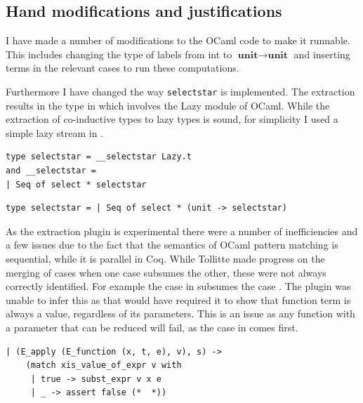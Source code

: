 \documentclass[12pt,twoside,notitlepage]{report}
\begin{document}
\subsection{Hand modifications and justifications}
I have made a number of modifications to the OCaml code to make it runnable. This includes changing the type of labels from int to $ \textbf{unit}\rightarrow\textbf{unit} $ and inserting terms in the relevant cases to run these computations. 

Furthermore I have changed the way \verb|selectstar| is implemented. The extraction results in the type in  which involves the Lazy module of OCaml. While the extraction of co-inductive types to lazy types is sound, for simplicity I used a simple lazy stream in . 

\begin{minipage}{\linewidth}
\begin{lstlisting}[caption={OCaml lazy selectstar}, label={lst:ocamllazystar}]
type selectstar = __selectstar Lazy.t
and __selectstar =
| Seq of select * selectstar
\end{lstlisting}
\end{minipage}

\begin{minipage}{\linewidth}
\begin{lstlisting}[caption={OCaml stream selectstar}, label={lst:ocamlstreamstar}]
type selectstar = | Seq of select * (unit -> selectstar) 
\end{lstlisting}
\end{minipage}

As the extraction plugin is experimental there were a number of inefficiencies and a few issues due to the fact that the semantics of OCaml pattern matching is sequential, while it is parallel in Coq. While Tollitte\cite{tollitte2012producing} made progress on the merging of cases when one case subsumes the other, these were not always correctly identified. For example the case  in  subsumes the case . The plugin was unable to infer this as that would have required it to show that function term is always a value, regardless of its parameters. This is an issue as any function with a parameter that can be reduced will fail, as the case in  comes first.

\begin{minipage}{\linewidth}
\begin{lstlisting}[caption={OCaml original substitution case}, label={lst:ocamlorigsub}]
  | (E_apply (E_function (x, t, e), v), s) ->
    (match xis_value_of_expr v with
     | true -> subst_expr v x e
     | _ -> assert false (*  *))
\end{lstlisting}
\end{minipage}
\end{document}
